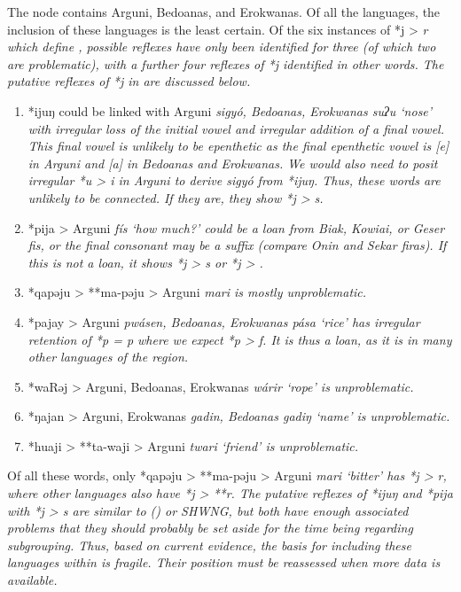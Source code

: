 The  node contains Arguni, Bedoanas, and Erokwanas.
Of all the  languages,
the inclusion of these languages is the least certain.
Of the six instances of *j > \it{r} which define ,
possible reflexes have only been identified for three (of which
two are problematic), with a further four reflexes of *j identified in other words.
The putative reflexes of *j in  are
discussed below.

\begin{enumerate}
	\item	*ijuŋ could be linked with Arguni \it{sigyó},
				Bedoanas, Erokwanas \it{suʔu} ‘nose’ with irregular loss of the
				initial vowel and irregular addition of a final vowel.
				This final vowel is unlikely to be epenthetic as the final epenthetic
				vowel is [e] in Arguni
				and [a] in Bedoanas and Erokwanas.
				We would also need to posit irregular *u > \it{i} in Arguni to
				derive \it{sigyó} from *ijuŋ.
				Thus, these words are unlikely to be connected.
				If they are, they show *j > \it{s}.
	\item	*pija > Arguni \it{fís} ‘how much?’ could be a loan from
				Biak, Kowiai, or Geser \it{fis}, or the final consonant may be a suffix
				(compare Onin and Sekar \it{firas}).
				If this is not a loan,
				it shows *j > \it{s} or *j > {\0}.
	\item	*qapəju > **ma-pəju > Arguni \it{mari} is mostly unproblematic.
	\item	*pajay > Arguni \it{pwásen},
				Bedoanas, Erokwanas \it{pása} ‘rice’ has irregular retention
				of *p = \it{p} where we expect *p > \it{f}.
				It is thus a loan,
				as it is in many other languages of the region.
	\item	*waRəj > Arguni,
				Bedoanas, Erokwanas \it{wárir} ‘rope’ is unproblematic.
	\item	*ŋajan > Arguni,
				Erokwanas \it{gadin}, Bedoanas \it{gadiŋ} ‘name’ is unproblematic.
	\item	*huaji > **ta-waji > Arguni \it{twari} ‘friend’ is unproblematic.
\end{enumerate}

Of all these words,
only *qapəju > **ma-pəju > Arguni \it{mari} ‘bitter’ has *j >
\it{r,} where other  languages also have *j > **r.
The putative reflexes of *ijuŋ
and *pija with *j > \it{s} are similar to 
() or SHWNG, but both have enough associated problems that they should probably
be set aside for the time being regarding subgrouping.
Thus, based on current evidence,
the basis for including these languages within  is fragile.
Their position must be reassessed when more data is available.

